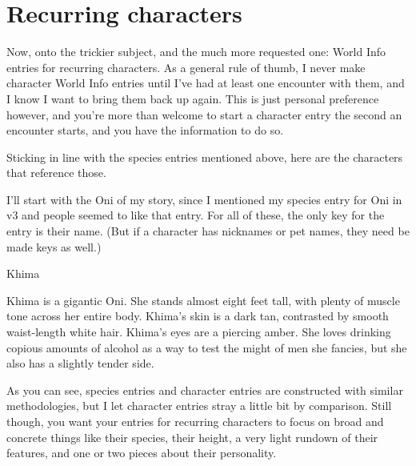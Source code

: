 \documentclass[Source-main.tex]{subfiles}
\begin{document}
\chapter{Recurring characters}
\label{appendix:characters}

Now, onto the trickier subject, and the much more requested one: World Info entries for recurring characters.
As a general rule of thumb, I never make character World Info entries until I’ve had at least one encounter with them, and I know I want to bring them back up again.
This is just personal preference however, and you’re more than welcome to start a character entry the second an encounter starts, and you have the information to do so.

Sticking in line with the species entries mentioned above, here are the characters that reference those.


I’ll start with the Oni of my story, since I mentioned my species entry for Oni in v3 and people seemed to like that entry.
For all of these, the only key for the entry is their name.
(But if a character has nicknames or pet names, they need be made keys as well.)

\begin{WIbox}{Khima}

Khima is a gigantic Oni.
She stands almost eight feet tall, with plenty of muscle tone across her entire body.
Khima’s skin is a dark tan, contrasted by smooth waist-length white hair.
Khima's eyes are a piercing amber.
She loves drinking copious amounts of alcohol as a way to test the might of men she fancies, but she also has a slightly tender side.

\end{WIbox}

As you can see, species entries and character entries are constructed with similar methodologies, but I let character entries stray a little bit by comparison.
Still though, you want your entries for recurring characters to focus on broad and concrete things like their species, their height, a very light rundown of their features, and one or two pieces about their personality.

\end{document}

